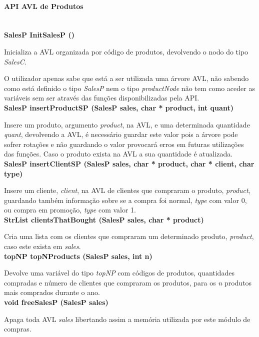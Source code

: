 \documentclass[10pt] {article}
\begin{document}
\paragraph{API AVL de Produtos}\mbox{}\\
\textbf {SalesP InitSalesP ()}
 \par Inicializa a AVL organizada por código de produtos, devolvendo o nodo do tipo \emph{SalesC}.
 \par O utilizador apenas sabe que está a ser utilizada uma árvore AVL, não sabendo como está definido o tipo 
 \emph{SalesP} nem o tipo \emph{productNode} não tem como aceder as variáveis sem ser através das funções 
 disponibilizadas pela API. \\

\noindent \textbf {SalesP insertProductSP (SalesP sales, char * product, int quant)}
\par Insere um produto, argumento \emph{product}, na AVL, e uma determinada quantidade \emph{quant}, 
devolvendo a AVL, é necessário guardar este valor pois a árvore pode sofrer rotações e não guardando o valor 
provocará erros em futuras utilizações das funções. Caso o produto exista na AVL a sua quantidade é atualizada.\\

\noindent \textbf {SalesP insertClientSP (SalesP sales, char * product, char * client, char type)}
\par Insere um cliente, \emph{client}, na AVL de clientes que compraram o produto, \emph{product}, guardando 
também informação sobre se a compra foi normal, \emph{type} com valor 0, ou compra em promoção, 
\emph{type} com valor 1.\\

\noindent \textbf {StrList clientsThatBought (SalesP sales, char * product)}
\par Cria uma lista com os clientes que compraram um determinado produto, \emph{product}, caso este exista em
\emph{sales}.\\

\noindent \textbf {topNP topNProducts (SalesP sales, int n)}
\par Devolve uma variável do tipo \emph{topNP} com códigos de produtos, quantidades compradas e número de 
clientes que compraram os produtos, para os \emph{n} produtos mais comprados durante o ano.\\

\noindent \textbf {void freeSalesP (SalesP sales)}
\par Apaga toda AVL \emph{sales} libertando assim a memória utilizada por este módulo de compras.\\
\end{document}
